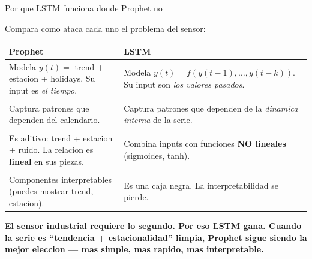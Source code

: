 \documentclass[aspectratio=169, 11pt]{beamer}
\begin{document}
\begin{frame}[shrink]{Por que LSTM funciona donde Prophet no}
  \begin{tcolorbox}[colback=arcaGray, colframe=arcaRed, leftrule=3pt,
    boxrule=0pt, sharp corners, left=8pt, right=8pt, top=4pt, bottom=4pt]
    {\footnotesize\color{arcaDark}
    Compara como ataca cada uno el problema del sensor:\par}
  \end{tcolorbox}
  \vspace{4pt}
  \begin{center}
  \begin{tabular}{p{} p{}}
    \toprule
    \footnotesize\textbf{\color{arcaRed} Prophet} & \footnotesize\textbf{\color{codeGreen} LSTM}\\
    \midrule
    \scriptsize Modela $y(t) = $ trend + estacion + holidays. Su input es \emph{el tiempo}.
    & \scriptsize Modela $y(t) = f(y(t-1), \ldots, y(t-k))$. Su input son \emph{los valores pasados}.\\
    \\
    \scriptsize Captura patrones que dependen del calendario.
    & \scriptsize Captura patrones que dependen de la \emph{dinamica interna} de la serie.\\
    \\
    \scriptsize Es aditivo: trend + estacion + ruido. La relacion es \textbf{lineal} en sus piezas.
    & \scriptsize Combina inputs con funciones \textbf{NO lineales} (sigmoides, tanh).\\
    \\
    \scriptsize Componentes interpretables (puedes mostrar trend, estacion).
    & \scriptsize Es una caja negra. La interpretabilidad se pierde.\\
    \bottomrule
  \end{tabular}
  \end{center}
  \vspace{6pt}
  \begin{tcolorbox}[colback=arcaRed!8, colframe=arcaRed, leftrule=3pt,
    boxrule=0pt, sharp corners, left=8pt, right=8pt, top=4pt, bottom=4pt]
    {\footnotesize\color{arcaDark}\bfseries
    El sensor industrial requiere lo segundo. Por eso LSTM gana.
    Cuando la serie es ``tendencia + estacionalidad'' limpia, Prophet sigue siendo
    la mejor eleccion --- mas simple, mas rapido, mas interpretable.}
  \end{tcolorbox}
\end{frame}
\end{document}
